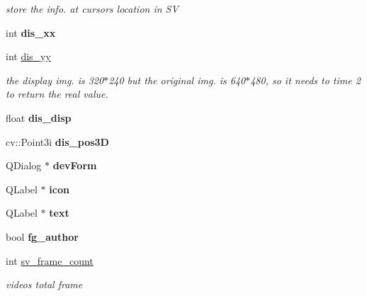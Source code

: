 \begin{DoxyCompactItemize}
\begin{DoxyCompactList}\small\item\em store the info. at cursor\textquotesingle{}s location in S\+V \end{DoxyCompactList}\item 
\hypertarget{class_main_window_ac27903cbd0c42ab055ae5b9a2dea3fbe}{}int {\bfseries dis\+\_\+xx}\label{class_main_window_ac27903cbd0c42ab055ae5b9a2dea3fbe}

\item 
\hypertarget{class_main_window_aa332ae26c7db5cdc0e5ddc7b64685914}{}int \hyperlink{class_main_window_aa332ae26c7db5cdc0e5ddc7b64685914}{dis\+\_\+yy}\label{class_main_window_aa332ae26c7db5cdc0e5ddc7b64685914}

\begin{DoxyCompactList}\small\item\em the display img. is 320$\ast$240 but the original img. is 640$\ast$480, so it needs to time 2 to return the real value. \end{DoxyCompactList}\item 
\hypertarget{class_main_window_ae17245ee58e27a07102cd08de74997a9}{}float {\bfseries dis\+\_\+disp}\label{class_main_window_ae17245ee58e27a07102cd08de74997a9}

\item 
\hypertarget{class_main_window_acd192384d8510cd3bb439a0b3ecd9395}{}cv\+::\+Point3i {\bfseries dis\+\_\+pos3\+D}\label{class_main_window_acd192384d8510cd3bb439a0b3ecd9395}

\item 
\hypertarget{class_main_window_a884603ea8ca5378e26024f3b953bb112}{}Q\+Dialog $\ast$ {\bfseries dev\+Form}\label{class_main_window_a884603ea8ca5378e26024f3b953bb112}

\item 
\hypertarget{class_main_window_a5aaada9c773e29bec2a8e37c341760cd}{}Q\+Label $\ast$ {\bfseries icon}\label{class_main_window_a5aaada9c773e29bec2a8e37c341760cd}

\item 
\hypertarget{class_main_window_a97d9df9749efe3d6f432a586f5dc8b38}{}Q\+Label $\ast$ {\bfseries text}\label{class_main_window_a97d9df9749efe3d6f432a586f5dc8b38}

\item 
\hypertarget{class_main_window_ae8619e628eef24b8b265dfef442b53ad}{}bool {\bfseries fg\+\_\+author}\label{class_main_window_ae8619e628eef24b8b265dfef442b53ad}

\item 
\hypertarget{class_main_window_a42ff5984e8e5c461cc1497a6ab2cd418}{}int \hyperlink{class_main_window_a42ff5984e8e5c461cc1497a6ab2cd418}{sv\+\_\+frame\+\_\+count}\label{class_main_window_a42ff5984e8e5c461cc1497a6ab2cd418}

\begin{DoxyCompactList}\small\item\em video\textquotesingle{}s total frame \end{DoxyCompactList}\end{DoxyCompactItemize}


